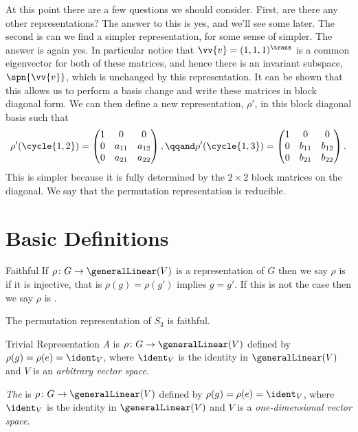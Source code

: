 At this point there are a few questions we should consider.
First, are there any other representations?
The answer to this is yes, and we'll see some later.
The second is can we find a simpler representation, for some sense of
simpler.
The answer is again yes.
In particular notice that \(\vv{v} = (1, 1, 1)^{\trans}\) is a common
eigenvector for both of these matrices, and hence there is an invariant
subspace, \(\spn\{\vv{v}\}\), which is unchanged by this representation.
It can be shown that this allows us to perform a basis change and write
these matrices in block diagonal form.
We can then define a new representation, \(\rho'\), in this block diagonal
basis such that
\begin{equation}
    \rho'(\cycle{1, 2}) = 
    \begin{pmatrix}
        1 & 0 & 0\\
        0 & a_{11} & a_{12}\\
        0 & a_{21} & a_{22}
    \end{pmatrix}
    ,\qqand \rho'(\cycle{1, 3}) = 
    \begin{pmatrix}
        1 & 0 & 0\\
        0 & b_{11} & b_{12}\\
        0 & b_{21} & b_{22}
    \end{pmatrix}
    .
\end{equation}
This is simpler because it is fully determined by the \(2\times 2\) block
matrices on the diagonal.
We say that the permutation representation is reducible.

\section{Basic Definitions}
\begin{dfn}{Faithful}{}
    If \(\rho \colon G \to \generalLinear(V)\) is a representation of \(G\)
    then we say \(\rho\) is  if it
    is injective, that is \(\rho(g) = \rho(g')\) implies \(g = g'\).
    If this is not the case then we say \(\rho\) is
    .
\end{dfn}

The permutation representation of \(S_3\) is faithful.

\begin{dfn}{Trivial Representation}{}
    \emph{A}  is \(\rho\colon G \to
    \generalLinear(V)\) defined by \(\rho(g) = \rho(e) = \ident_V\), where
    \(\ident_V\) is the identity in \(\generalLinear(V)\) and \(V\) is an
    \emph{arbitrary vector space}.
    
    \emph{The}  is \(\rho\colon G \to
    \generalLinear(V)\) defined by \(\rho(g) = \rho(e) = \ident_V\), where
    \(\ident_V\) is the identity in \(\generalLinear(V)\) and \(V\) is a
    \emph{one-dimensional vector space}.
\end{dfn}

